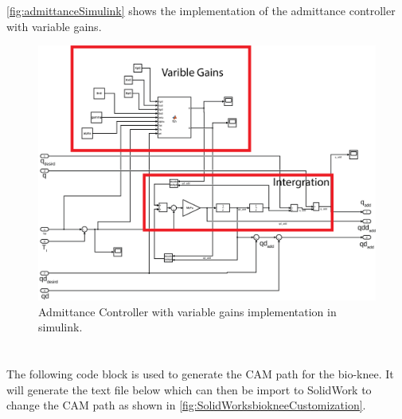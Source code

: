  \autoref{fig:admittanceSimulink} shows the implementation of the admittance controller with variable gains. 
 
\begin{figure}[h]
     \centering
     \includegraphics[width=\textwidth]{images/appendix/addmittance_simulink.png}
     \caption[Simulink Admittance Controller]{Admittance Controller with variable gains implementation in simulink.}
    \label{fig:admittanceSimulink}
\end{figure}



\chapter{}

The following code block is used to generate the CAM path for the bio-knee. It will generate the text file below which can then be import to SolidWork to change the CAM path as shown in \autoref{fig:SolidWorksbiokneeCustomization}. 






